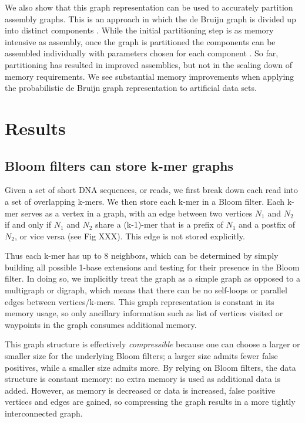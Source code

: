 \documentclass[12pt]{article} \usepackage{simplemargins}
\begin{document}
We also show that this graph representation can be used to accurately
partition assembly graphs.  This is an approach in which the de Bruijn
graph is divided up into distinct components \cite{trinity,
  metavelvet,pubmed21685107}.  While the initial partitioning step is
as memory intensive as assembly, once the graph is partitioned the
components can be assembled individually with parameters chosen for
each component \cite{metavelvet,pubmed21685107}.  So far, partitioning
has resulted in improved assemblies, but not in the scaling down
of memory requirements.  We see substantial memory improvements when
applying the probabilistic de Bruijn graph representation to
artificial data sets.


\section{Results}

\subsection{Bloom filters can store k-mer graphs}

Given a set of short DNA sequences, or reads, we first break down each
read into a set of overlapping k-mers.  We then store each k-mer
in a Bloom filter.  Each k-mer serves as a vertex in a graph, with an edge
between two vertices $N_1$ and $N_2$ if and only if $N_1$ and $N_2$
share a (k-1)-mer that is a prefix of $N_1$ and a postfix of $N_2$,
or vice versa (see Fig XXX).  This edge is not stored explicitly.

Thus each k-mer has up to 8 neighbors, which can be determined by
simply building all possible 1-base extensions and testing for their
presence in the Bloom filter.  In doing so, we implicitly treat
the graph as a simple graph as opposed to a multigraph or digraph,
which means that there can be no self-loops or parallel edges between
vertices/k-mers. This graph representation is constant in its memory
usage, so only ancillary information such as list of vertices visited
or waypoints in the graph consumes additional memory.

This graph structure is effectively {\em compressible} because one can
choose a larger or smaller size for the underlying Bloom filters; a
larger size admits fewer false positives, while a smaller size admits
more. By relying on Bloom filters, the data structure is constant
memory: no extra memory is used as additional data is added. However,
as memory is decreased or data is increased, false positive vertices
and edges are gained, so compressing the graph results in a more
tightly interconnected graph.
\end{document}
